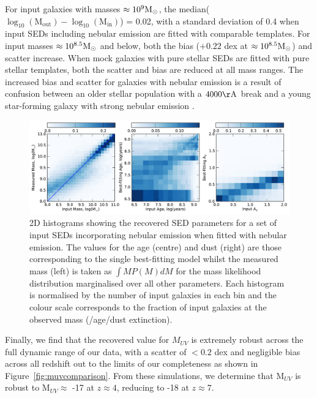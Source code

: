 For input galaxies with masses $\approx 10^9 \rm{M}_{\odot}$, the median($\log_{10}(\text{M}_{\text{out}}) - \log_{10}(\text{M}_{\text{in}})$) = 0.02, with a standard deviation of 0.4 when input SEDs including nebular emission are fitted with comparable templates. For input masses $\approx 10^{8.5} \rm{M}_{\odot}$ and below, both the bias ($+0.22$ dex at $\approx 10^{8.5} \rm{M}_{\odot}$) and scatter increase.
When mock galaxies with pure stellar SEDs are fitted with pure stellar templates, both the scatter and bias are reduced at all mass ranges. The increased bias and scatter for galaxies with nebular emission is a result of confusion between an older stellar population with a $4000\rm{\AA}$ break and a young star-forming galaxy with strong nebular emission \citep{2009A&A...502..423S,2013MNRAS.429..302C}. 

\begin{figure}
\includegraphics[width=\textwidth]{plots/fig5.pdf}
\caption[2D histograms showing the recovered SED parameters for a set of input SEDs incorporating nebular emission when fitted with nebular emission.]{2D histograms showing the recovered SED parameters for a set of input SEDs incorporating nebular emission when fitted with nebular emission. The values for the age (centre) and dust (right) are those corresponding to the single best-fitting model whilst the measured mass (left) is taken as $\int M P(M)dM$ for the mass likelihood distribution  marginalised over all other parameters. Each histogram is normalised by the number of input galaxies in each bin and the colour scale corresponds to the fraction of input galaxies at the observed mass (/age/dust extinction).}
\label{fig:masscomparison}
\end{figure}

Finally, we find that the recovered value for $M_{UV}$ is extremely robust across the full dynamic range of our data, with a scatter of $< 0.2$ dex and negligible bias across all redshift out to the limits of our completeness as shown in Figure~\ref{fig:muvcomparison}. From these simulations, we determine that M$_{UV}$ is robust to M$_{UV} \approx$ -17 at $z \approx 4$, reducing to -18 at $z \approx 7$.

